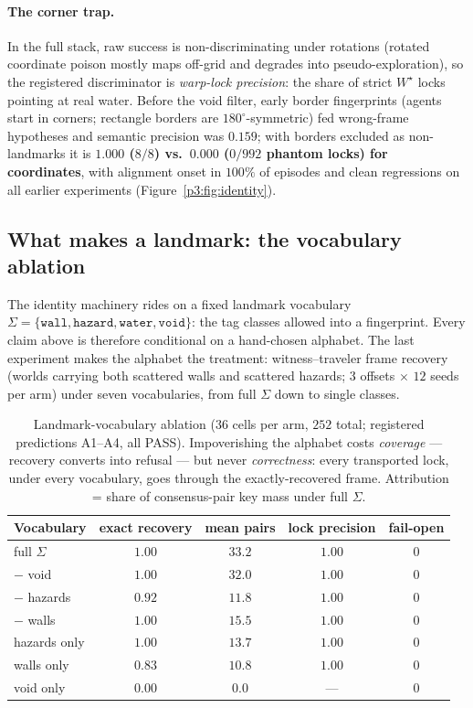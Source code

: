 \documentclass{article}
\newcommand{\wstar}{W^{\star}}
\begin{document}
\paragraph{The corner trap.} In the full stack, raw success is
non-discriminating under rotations (rotated coordinate poison mostly
maps off-grid and degrades into pseudo-exploration), so the
registered discriminator is \emph{warp-lock precision}: the share of
strict $\wstar$ locks pointing at real water. Before the void filter,
early border fingerprints (agents start in corners; rectangle borders
are $180^\circ$-symmetric) fed wrong-frame hypotheses and semantic
precision was $0.159$; with borders excluded as non-landmarks it is
\textbf{$1.000$ ($8/8$) vs.\ $0.000$ ($0/992$ phantom locks) for
coordinates}, with alignment onset in $100\%$ of episodes and clean
regressions on all earlier experiments
(Figure~\ref{p3:fig:identity}).

\subsection{What makes a landmark: the vocabulary ablation}
\label{p3:sec:ablation}

The identity machinery rides on a fixed landmark vocabulary $\Sigma =
\{\texttt{wall}, \texttt{hazard}, \texttt{water}, \texttt{void}\}$:
the tag classes allowed into a fingerprint. Every claim above is
therefore conditional on a hand-chosen alphabet. The last experiment
makes the alphabet the treatment: witness--traveler frame recovery
(worlds carrying both scattered walls and scattered hazards; $3$
offsets $\times$ $12$ seeds per arm) under seven vocabularies, from
full $\Sigma$ down to single classes.

\begin{table}[h]
\centering
\caption{Landmark-vocabulary ablation ($36$ cells per arm, $252$
total; registered predictions A1--A4, all PASS). Impoverishing the
alphabet costs \emph{coverage} --- recovery converts into refusal ---
but never \emph{correctness}: every transported lock, under every
vocabulary, goes through the exactly-recovered frame. Attribution =
share of consensus-pair key mass under full $\Sigma$.}
\label{p3:tab:ablation}
\small
\begin{tabular}{lcccc}
\toprule
Vocabulary & exact recovery & mean pairs & lock precision & fail-open \\
\midrule
full $\Sigma$ & $1.00$ & $33.2$ & $1.00$ & $0$ \\
$-$ void & $1.00$ & $32.0$ & $1.00$ & $0$ \\
$-$ hazards & $0.92$ & $11.8$ & $1.00$ & $0$ \\
$-$ walls & $1.00$ & $15.5$ & $1.00$ & $0$ \\
hazards only & $1.00$ & $13.7$ & $1.00$ & $0$ \\
walls only & $0.83$ & $10.8$ & $1.00$ & $0$ \\
void only & $0.00$ & $0.0$ & --- & $0$ \\
\bottomrule
\end{tabular}
\end{table}
\end{document}
